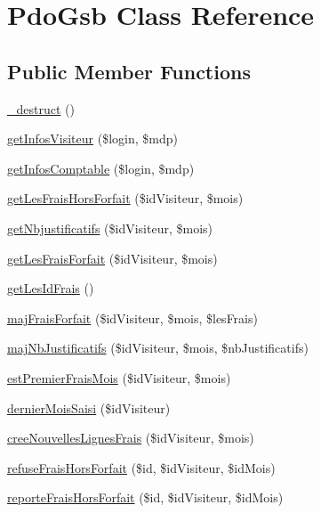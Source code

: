 \hypertarget{class_pdo_gsb}{}\section{Pdo\+Gsb Class Reference}
\label{class_pdo_gsb}
\subsection*{Public Member Functions}
\begin{DoxyCompactItemize}
\item 
\hyperlink{class_pdo_gsb_a1c6024f681d3956654622d9f28e540a2}{\+\_\+destruct} ()
\item 
\hyperlink{class_pdo_gsb_a3405f494d610cddab3b7dcfb2fe80d45}{get\+Infos\+Visiteur} (\$login, \$mdp)
\item 
\hyperlink{class_pdo_gsb_a0e988b904e341df853113ed487535884}{get\+Infos\+Comptable} (\$login, \$mdp)
\item 
\hyperlink{class_pdo_gsb_aa89782786e0037745abd9c62b25ade20}{get\+Les\+Frais\+Hors\+Forfait} (\$id\+Visiteur, \$mois)
\item 
\hyperlink{class_pdo_gsb_a147b85ddcddef68c57acf34857630ba7}{get\+Nbjustificatifs} (\$id\+Visiteur, \$mois)
\item 
\hyperlink{class_pdo_gsb_a5792eb474723cda0a758735f5fbb791e}{get\+Les\+Frais\+Forfait} (\$id\+Visiteur, \$mois)
\item 
\hyperlink{class_pdo_gsb_ad0943d4cabc4e6bfd803ecab13be0e57}{get\+Les\+Id\+Frais} ()
\item 
\hyperlink{class_pdo_gsb_abeb6aae3e806cd3235ebec6ae5cbe7de}{maj\+Frais\+Forfait} (\$id\+Visiteur, \$mois, \$les\+Frais)
\item 
\hyperlink{class_pdo_gsb_ac3bcdeeb2e7522120cec7ec068b153b3}{maj\+Nb\+Justificatifs} (\$id\+Visiteur, \$mois, \$nb\+Justificatifs)
\item 
\hyperlink{class_pdo_gsb_a426147406c706370eeb5d17175c33562}{est\+Premier\+Frais\+Mois} (\$id\+Visiteur, \$mois)
\item 
\hyperlink{class_pdo_gsb_a5bde16f5acfa92c7810433187f3e05f1}{dernier\+Mois\+Saisi} (\$id\+Visiteur)
\item 
\hyperlink{class_pdo_gsb_ae42a666f0c62b60a6fe35448e3600d8a}{cree\+Nouvelles\+Lignes\+Frais} (\$id\+Visiteur, \$mois)
\item 
\hyperlink{class_pdo_gsb_a8c4ed4306802e229bdaed4797556e962}{refuse\+Frais\+Hors\+Forfait} (\$id, \$id\+Visiteur, \$id\+Mois)
\item 
\hyperlink{class_pdo_gsb_aa0ac60fc083b55e7faec0689d5150bfd}{reporte\+Frais\+Hors\+Forfait} (\$id, \$id\+Visiteur, \$id\+Mois)

\end{DoxyCompactItemize}
